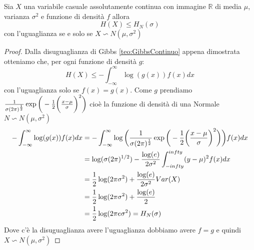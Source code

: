 \begin{teo}
Sia $X$ una variabile casuale assolutamente continua con immagine $\mathbb{R}$ di media $\mu$, varianza $\sigma^2$ e funzione di densità $f$ allora
$$H(X) \leq H_N(\sigma)$$
con l'uguaglianza se e solo se $X\backsim N(\mu,\sigma^2)$
\end{teo}
\begin{proof}
Dalla disuguaglianza di Gibbs \ref{teo:GibbsContinuo} appena dimostrata otteniamo che, per ogni funzione di densità $g$:
$$H(X)\leq - \int_{-\infty}^\infty \log (g(x))f(x)dx$$
con l'uguaglianza solo se $f(x)=g(x)$.
Come $g$ prendiamo $\frac{1}{\sigma (2\pi)^{\frac{1}{2}}} \exp \bigg( - \frac{1}{2} \bigg( \frac{x-\mu}{ \sigma} \bigg)^2 \bigg)$ cioè la funzione di densità di una Normale $N\backsim N(\mu, \sigma^2)$
\[
\begin{split}
- \int_{-\infty}^\infty \log (g(x))f(x)dx &= - \int_{-\infty}^\infty \log \bigg( \frac{1}{\sigma (2\pi)^{\frac{1}{2}}} \exp \bigg( - \frac{1}{2} \bigg( \frac{x-\mu}{ \sigma} \bigg)^2 \bigg)\bigg)f(x)dx\\
&= \log(\sigma(2\pi)^{1/2})- \frac{\log(e)}{2\sigma^2}\int_{-infty}^{infty} (y-\mu)^2f(x)dx \\
&= \frac{1}{2} \log(2\pi \sigma^2)+ \frac{ \log(e)}{2\sigma^2} Var(X)\\
&=\frac{1}{2} \log(2\pi \sigma^2)+ \frac{ \log(e)}{2}\\
&=\frac{1}{2} \log(2\pi e \sigma^2)=H_N(\sigma)
\end{split}
\]
Dove c'è la disuguaglianza avere l'uguaglianza dobbiamo avere $f=g$ e quindi $X\backsim N(\mu,\sigma^2)$
\end{proof}













